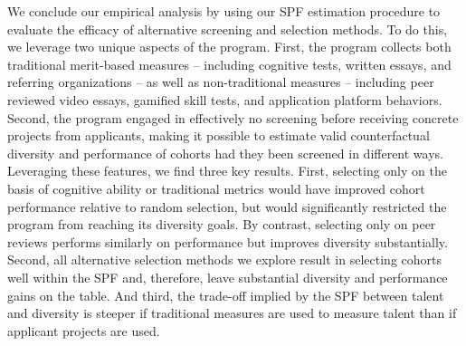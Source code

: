 We conclude our empirical analysis by using our SPF estimation procedure to evaluate the efficacy of alternative screening and selection methods. To do this, we leverage two unique aspects of the program. First, the program collects both traditional merit-based measures -- including cognitive tests, written essays, and referring organizations -- as well as non-traditional measures -- including peer reviewed video essays, gamified skill tests, and application platform behaviors. Second, the program engaged in effectively no screening before receiving concrete projects from applicants, making it possible to estimate valid counterfactual diversity and performance of cohorts had they been screened in different ways. Leveraging these features, we find three key results. First, selecting only on the basis of cognitive ability or traditional metrics would have improved cohort performance relative to random selection, but would significantly restricted the program from reaching its diversity goals. By contrast, selecting only on peer reviews performs similarly on performance but improves diversity substantially. Second, all alternative selection methods we explore result in selecting cohorts well within the SPF and, therefore, leave substantial diversity and performance gains on the table. And third, the trade-off implied by the SPF between talent and diversity is steeper if traditional measures are used to measure talent than if applicant projects are used. 

